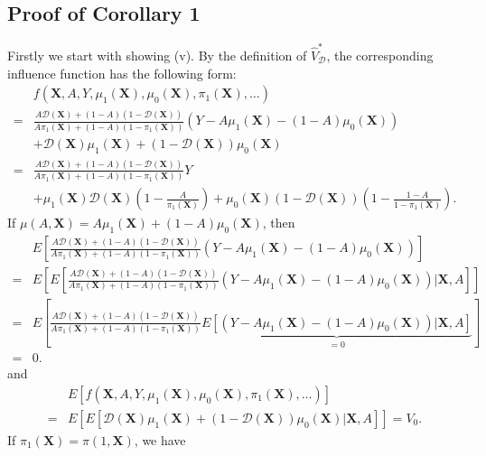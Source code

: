 \documentclass[11pt]{article}
\theoremstyle{referenceplain}
\theoremstyle{referencedefinition}
\theoremstyle{referenceremark}
\begin{document}
\subsection{Proof of Corollary 1}
Firstly we start with showing (v). By the definition of $\widehat{V}_{\mathcal{D}}^*$, the corresponding influence function has the following form:
\begin{align*}
    &f(\mathbf{X},A,Y,\mu_1(\mathbf{X}),\mu_0(\mathbf{X}),\pi_1(\mathbf{X}),\dots)\\
    =&\frac{A \mathcal{D}(\mathbf{X})+(1-A)(1-\mathcal{D}(\mathbf{X}))}{A\pi_1(\mathbf{X})+(1-A)(1-\pi_1(\mathbf{X}))}(Y-A \mu_1(\mathbf{X})-(1-A)\mu_0(\mathbf{X}))\\
    &+\mathcal{D}(\mathbf{X})\mu_1(\mathbf{X})+(1-\mathcal{D}(\mathbf{X}))\mu_0(\mathbf{X})\\
    =&\frac{A \mathcal{D}(\mathbf{X})+(1-A)(1-\mathcal{D}(\mathbf{X}))}{A\pi_1(\mathbf{X})+(1-A)(1-\pi_1(\mathbf{X}))}Y\\&+\mu_1(\mathbf{X})\mathcal{D}(\mathbf{X})\left(1-\frac{A}{\pi_1(\mathbf{X})}\right)+\mu_0(\mathbf{X})(1-\mathcal{D}(\mathbf{X}))\left(1-\frac{1-A}{1-\pi_1(\mathbf{X})}\right).
\end{align*}
If $\mu(A,\mathbf{X}) = A\mu_1(\mathbf{X})+(1-A)\mu_0(\mathbf{X})$, then 
\begin{align*}
    &E\left[\frac{A \mathcal{D}(\mathbf{X})+(1-A)(1-\mathcal{D}(\mathbf{X}))}{A\pi_1(\mathbf{X})+(1-A)(1-\pi_1(\mathbf{X}))}(Y-A \mu_1(\mathbf{X})-(1-A)\mu_0(\mathbf{X}))\right]\\
    =&E\left[E\left[\frac{A \mathcal{D}(\mathbf{X})+(1-A)(1-\mathcal{D}(\mathbf{X}))}{A\pi_1(\mathbf{X})+(1-A)(1-\pi_1(\mathbf{X}))}(Y-A \mu_1(\mathbf{X})-(1-A)\mu_0(\mathbf{X}))\bigg|\mathbf{X},A\right]\right]\\
    =&E\left[\frac{A \mathcal{D}(\mathbf{X})+(1-A)(1-\mathcal{D}(\mathbf{X}))}{A\pi_1(\mathbf{X})+(1-A)(1-\pi_1(\mathbf{X}))}\underbrace{E\left[(Y-A \mu_1(\mathbf{X})-(1-A)\mu_0(\mathbf{X}))\bigg|\mathbf{X},A\right]}_{=0}\right]\\
    =&0.
\end{align*}
and 
\begin{align*}
    &E\left[f(\mathbf{X},A,Y,\mu_1(\mathbf{X}),\mu_0(\mathbf{X}),\pi_1(\mathbf{X}),\dots)\right]\\
    =&E\left[E\left[\mathcal{D}(\mathbf{X})\mu_1(\mathbf{X})+(1-\mathcal{D}(\mathbf{X}))\mu_0(\mathbf{X})|\mathbf{X},A\right]\right]=V_0.
\end{align*}
If $\pi_1(\mathbf{X}) = \pi(1,\mathbf{X})$, we have
\end{document}
